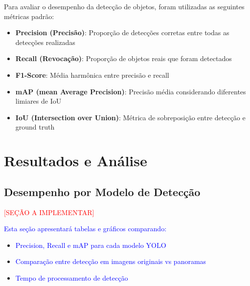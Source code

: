 Para avaliar o desempenho da detecção de objetos, foram utilizadas as seguintes métricas padrão:

\begin{itemize}
    \item \textbf{Precision (Precisão)}: Proporção de detecções corretas entre todas as detecções realizadas
    \item \textbf{Recall (Revocação)}: Proporção de objetos reais que foram detectados
    \item \textbf{F1-Score}: Média harmônica entre precisão e recall
    \item \textbf{mAP (mean Average Precision)}: Precisão média considerando diferentes limiares de IoU
    \item \textbf{IoU (Intersection over Union)}: Métrica de sobreposição entre detecção e ground truth
\end{itemize}

\section{Resultados e Análise}

\subsection{Desempenho por Modelo de Detecção}

\textcolor{red}{[SEÇÃO A IMPLEMENTAR]}

\textcolor{blue}{Esta seção apresentará tabelas e gráficos comparando:}
\begin{itemize}
    \item \textcolor{blue}{Precision, Recall e mAP para cada modelo YOLO}
    \item \textcolor{blue}{Comparação entre detecção em imagens originais vs panoramas}
    \item \textcolor{blue}{Tempo de processamento de detecção}
\end{itemize}


